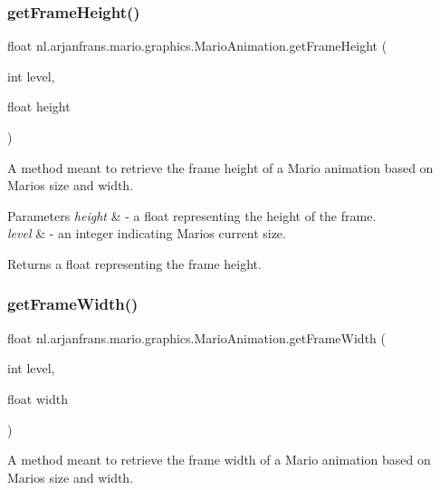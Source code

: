 \subsubsection{\texorpdfstring{get\+Frame\+Height()}{getFrameHeight()}}
{\footnotesize\ttfamily float nl.\+arjanfrans.\+mario.\+graphics.\+Mario\+Animation.\+get\+Frame\+Height (\begin{DoxyParamCaption}\item[{int}]{level,  }\item[{float}]{height }\end{DoxyParamCaption})}



A method meant to retrieve the frame height of a Mario animation based on Mario\textquotesingle{}s size and width. 


\begin{DoxyParams}{Parameters}
{\em height} & -\/ a float representing the height of the frame. \\
\hline
{\em level} & -\/ an integer indicating Mario\textquotesingle{}s current size. \\
\hline
\end{DoxyParams}
\begin{DoxyReturn}{Returns}
a float representing the frame height. 
\end{DoxyReturn}
\mbox{\label{classnl_1_1arjanfrans_1_1mario_1_1graphics_1_1MarioAnimation_a8f05347b79edd167309067ed7d3c2794}} 
\subsubsection{\texorpdfstring{get\+Frame\+Width()}{getFrameWidth()}}
{\footnotesize\ttfamily float nl.\+arjanfrans.\+mario.\+graphics.\+Mario\+Animation.\+get\+Frame\+Width (\begin{DoxyParamCaption}\item[{int}]{level,  }\item[{float}]{width }\end{DoxyParamCaption})}



A method meant to retrieve the frame width of a Mario animation based on Mario\textquotesingle{}s size and width. 


